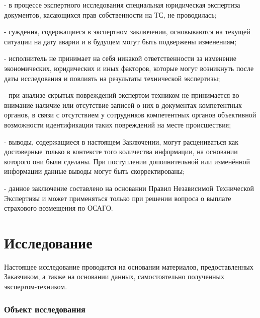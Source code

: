 \noindent - в процессе экспертного исследования специальная юридическая экспертиза документов, касающихся прав собственности на ТС, не проводилась;

\noindent - суждения, содержащиеся в экспертном заключении, основываются на текущей ситуации на дату аварии и в будущем могут быть подвержены изменениям;

\noindent - исполнитель не принимает на себя никакой ответственности за изменение экономических, юридических и иных факторов, которые могут возникнуть после даты исследования и повлиять на результаты технической экспертизы;

\noindent - при анализе скрытых повреждений экспертом-техником не принимается во внимание наличие или отсутствие записей о них в документах компетентных органов, в связи с отсутствием у сотрудников компетентных органов объективной возможности  идентификации таких повреждений на месте происшествия;


\noindent - выводы, содержащиеся в настоящем Заключении, могут расцениваться как достоверные только в контексте того количества информации, на основании которого они были сделаны. При поступлении дополнительной или изменённой информации данные выводы могут быть
скорректированы; 

\noindent - данное заключение составлено на основании Правил Независимой Технической Экспертизы и может применяться только при решении вопроса о выплате страхового возмещения по ОСАГО.


\section{Исследование}

Настоящее исследование проводится на основании материалов, предоставленных Заказчиком, а также на основании данных, самостоятельно полученных экспертом-техником.

\subsubsection{Объект исследования}

